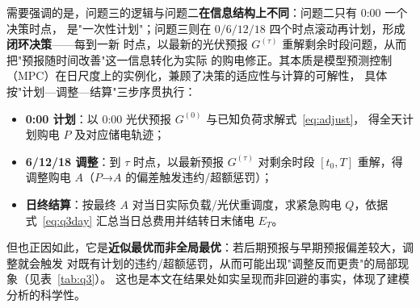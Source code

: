 \documentclass[withoutpreface]{cumcmthesis}
\begin{document}
需要强调的是，问题三的逻辑与问题二\textbf{在信息结构上不同}：问题二只有 0:00 一个决策时点，
是"一次性计划"；问题三则在 $0/6/12/18$ 四个时点滚动再计划，形成\textbf{闭环决策}——每到一新
时点，以最新的光伏预报 $G^{(\tau)}$ 重解剩余时段问题，从而把"预报随时间改善"这一信息转化为实际
的购电修正。其本质是模型预测控制（MPC）在日尺度上的实例化，兼顾了决策的适应性与计算的可解性，
具体按"计划—调整—结算"三步序贯执行：
\begin{itemize}
    \item \textbf{0:00 计划}：以 0:00 光伏预报 $G^{(0)}$ 与已知负荷求解式~\eqref{eq:adjust}，
          得全天计划购电 $P$ 及对应储电轨迹；
    \item \textbf{6/12/18 调整}：到 $\tau$ 时点，以最新预报 $G^{(\tau)}$ 对剩余时段
          $[t_0,T]$ 重解，得调整购电 $A$（$P$→$A$ 的偏差触发违约/超额惩罚）；
    \item \textbf{日终结算}：按最终 $A$ 对当日实际负载/光伏重调度，求紧急购电 $Q$，依据
          式~\eqref{eq:q3day} 汇总当日总费用并结转日末储电 $E_T$。
\end{itemize}
但也正因如此，它是\textbf{近似最优而非全局最优}：若后期预报与早期预报偏差较大，调整就会触发
对既有计划的违约/超额惩罚，从而可能出现"调整反而更贵"的局部现象（见表~\ref{tab:q3}）。
这也是本文在结果处如实呈现而非回避的事实，体现了建模分析的科学性。
\end{document}
